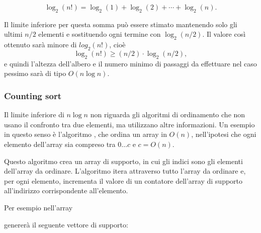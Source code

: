 \[ \log_2(n!) = \log_2(1)+\log_2(2)+\cdots+\log_2(n).\]

Il limite inferiore per questa somma può essere
stimato mantenendo solo gli ultimi $n/2$ elementi e
sostituendo ogni termine con $\log_2(n/2)$.
Il valore così ottenuto sarà minore di $log_2(n!)$, cioè 
\[ \log_2(n!) \ge (n/2) \cdot \log_2(n/2),\]
e quindi l'altezza dell'albero e il numero minimo 
di passaggi da effettuare nel caso pessimo 
sarà di tipo $O(n \log n)$.

\subsubsection{Counting sort}


Il limite inferiore di $n \log n$ non riguarda gli algoritmi
di ordinamento che non usano il confronto tra due elementi,
ma utilizzano altre informazioni.
Un esempio in questo senso è l'algoritmo
, che ordina un array in
$O(n)$, nell'ipotesi che ogni elemento dell'array sia compreso tra
$0 \ldots c$ e $c=O(n)$.

Questo algoritmo crea un array di supporto, in cui gli indici
sono gli elementi dell'array da ordinare.
L'algoritmo itera attraverso tutto l'array da ordinare e,
per ogni elemento, incrementa il valore di un contatore
dell'array di supporto all'indirizzo corrispondente all'elemento.
\newpage

Per esempio nell'array
\begin{center}
\end{center}
genererà il seguente vettore di supporto:
\begin{center}
\end{center}

